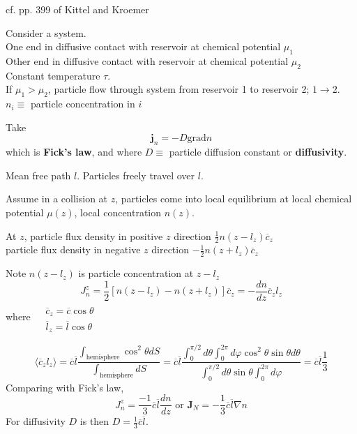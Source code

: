 \documentclass[10pt]{amsart}
\begin{document}
\begin{multicols*}{2}
cf. pp. 399 of Kittel and Kroemer \cite{CKittelHKroemer1980}

Consider a system.  \\
One end in diffusive contact with reservoir at chemical potential $\mu_1$ \\
Other end in diffusive contact with reservoir at chemical potential $\mu_2$ \\
Constant temperature $\tau$.  \\
If $\mu_1 > \mu_2$, particle flow through system from reservoir 1 to reservoir 2; $1\to 2$.   \\
$n_i \equiv $ particle concentration in $i$ 

Take
\begin{equation}
\mathbf{j}_n = -D \text{grad}n
\end{equation}
which is \textbf{Fick's law}, and where $D \equiv$ particle diffusion constant or \textbf{diffusivity}.  

Mean free path $l$.  Particles freely travel over $l$.  

Assume in a collision at $z$, particles come into local equilibrium at local chemical potential $\mu(z)$, local concentration $n(z)$.  

At $z$, particle flux density in positive $z$ direction \qquad $\frac{1}{2} n(z-l_z) \overline{c}_z$ \\
\phantom{At $z$, } particle flux density in negative $z$ direction \qquad $-\frac{1}{2} n(z+l_z) \overline{c}_z$

Note $n(z-l_z)$ is particle concentration at $z-l_z$
\[
J_n^z = \frac{1}{2} \left[ n(z-l_z) - n(z+l_z) \right] \overline{c}_z = -\frac{dn}{dz} \overline{c}_z l_z
\]
where $\begin{aligned} & \quad \\
  & \overline{c}_z = \overline{c} \cos{\theta}  \\
  & \overline{l}_z = \overline{l} \cos{\theta}  
\end{aligned}$

\[
\langle \overline{c}_z l_z \rangle = \overline{c} \overline{l} \frac{ \int_{\text{hemisphere} } \cos^2{\theta} dS }{ \int_{\text{hemisphere} } dS } = \overline{c}\overline{l} \frac{ \int_0^{\pi/2}d\theta \int_0^{2\pi } d\varphi \cos^2{\theta} \sin{\theta} d\theta }{ \int_0^{\pi/2} d\theta \sin{\theta} \int_0^{2\pi } d\varphi } = \overline{c} \overline{l} \frac{1}{3}
\]
Comparing with Fick's law, 
\[
J_n^z = \frac{-1}{3} \overline{c}\overline{l} \frac{dn}{dz} \text{ or } \mathbf{J}_N = -\frac{1}{3} \overline{c}\overline{l} \nabla n
\]
For diffusivity $D$ is then $D = \frac{1}{3} \overline{c}\overline{l}$.  


\end{multicols*}
\end{document}
